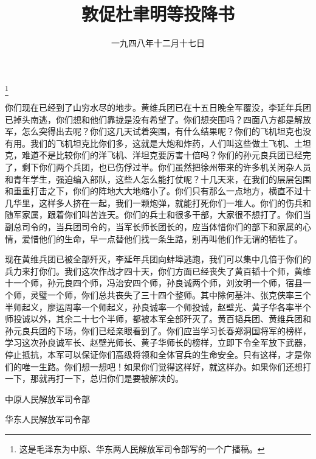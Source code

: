 
\title{敦促杜聿明等投降书}
\date{一九四八年十二月十七日}
\thanks{这是毛泽东为中原、华东两人民解放军司令部写的一个广播稿。}
\maketitle



你们现在已经到了山穷水尽的地步。黄维兵团已在十五日晚全军覆没，李延年兵团已掉头南逃，你们想和他们靠拢是没有希望了。你们想突围吗？四面八方都是解放军，怎么突得出去呢？你们这几天试着突围，有什么结果呢？你们的飞机坦克也没有用。我们的飞机坦克比你们多，这就是大炮和炸药，人们叫这些做土飞机、土坦克，难道不是比较你们的洋飞机、洋坦克要厉害十倍吗？你们的孙元良兵团已经完了，剩下你们两个兵团，也已伤俘过半。你们虽然把徐州带来的许多机关闲杂人员和青年学生，强迫编入部队，这些人怎么能打仗呢？十几天来，在我们的层层包围和重重打击之下，你们的阵地大大地缩小了。你们只有那么一点地方，横直不过十几华里，这样多人挤在一起，我们一颗炮弹，就能打死你们一堆人。你们的伤兵和随军家属，跟着你们叫苦连天。你们的兵士和很多干部，大家很不想打了。你们当副总司令的，当兵团司令的，当军长师长团长的，应当体惜你们的部下和家属的心情，爱惜他们的生命，早一点替他们找一条生路，别再叫他们作无谓的牺牲了。

现在黄维兵团已被全部歼灭，李延年兵团向蚌埠逃跑，我们可以集中几倍于你们的兵力来打你们。我们这次作战才四十天，你们方面已经丧失了黄百韬十个师，黄维十一个师，孙元良四个师，冯治安四个师，孙良诚两个师，刘汝明一个师，宿县一个师，灵璧一个师，你们总共丧失了三十四个整师。其中除何基沣、张克侠率三个半师起义，廖运周率一个师起义，孙良诚率一个师投诚，赵壁光、黄子华各率半个师投诚以外，其余二十七个半师，都被本军全部歼灭了。黄百韬兵团、黄维兵团和孙元良兵团的下场，你们已经亲眼看到了。你们应当学习长春郑洞国将军的榜样，学习这次孙良诚军长、赵壁光师长、黄子华师长的榜样，立即下令全军放下武器，停止抵抗，本军可以保证你们高级将领和全体官兵的生命安全。只有这样，才是你们的唯一生路。你们想一想吧！如果你们觉得这样好，就这样办。如果你们还想打一下，那就再打一下，总归你们是要被解决的。

中原人民解放军司令部

华东人民解放军司令部


